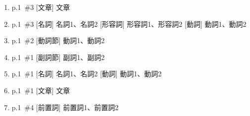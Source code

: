 \documentclass[a4paper,11pt]{jsarticle}
\begin{document}
\begin{enumerate}
  \setlength{\itemsep}{2truecm}
  \item
    p.1~\#3 [文章] 文章
  \item
    p.1~\#3  [名詞] 名詞1、名詞2  [形容詞] 形容詞1、形容詞2  [動詞] 動詞1、動詞2
  \item
    p.1~\#2  [動詞節] 動詞1、動詞2
  \item
    p.1~\#1  [副詞節] 副詞1、副詞2
  \item
    p.1~\#1  [名詞] 名詞1、名詞2  [動詞] 動詞1、動詞2
  \item
    p.1~\#1 [文章] 文章
  \item
    p.1~\#4  [前置詞] 前置詞1、前置詞2
\end{enumerate}
\end{document}
